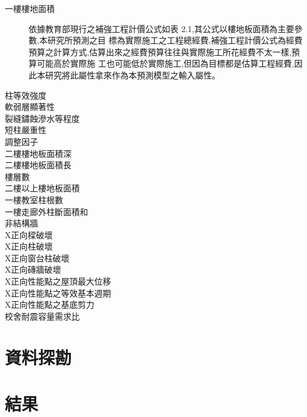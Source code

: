 \begin{description}
  \item[一樓樓地面積]
  依據教育部現行之補強工程計價公式如表 2.1,其公式以樓地板面積為主要參數,本研究所預測之目 標為實際施工之工程總經費,補強工程計價公式為經費預算之計算方式,估算出來之經費預算往往與實際施工所花經費不太一樣,預算可能高於實際施 工也可能低於實際施工,但因為目標都是估算工程經費,因此本研究將此屬性拿來作為本預測模型之輸入屬性。
  \item[柱等效強度]
  \item[軟弱層顯著性]
  \item[裂縫鏽蝕滲水等程度]
  \item[短柱嚴重性]
  \item[調整因子]
  \item[二樓樓地板面積深]
  \item[二樓樓地板面積長]
  \item[樓層數]
  \item[二樓以上樓地板面積]
  \item[一樓教室柱根數]
  \item[一樓走廊外柱斷面積和]
  \item[非結構牆]
  \item[X正向樑破壞]
  \item[X正向柱破壞]
  \item[X正向窗台柱破壞]
  \item[X正向磚牆破壞]
  \item[X正向性能點之屋頂最大位移]
  \item[X正向性能點之等效基本週期]
  \item[X正向性能點之基底剪力]
  \item[校舍耐震容量需求比]
\end{description}

\section{資料探勘}

\section{結果}


